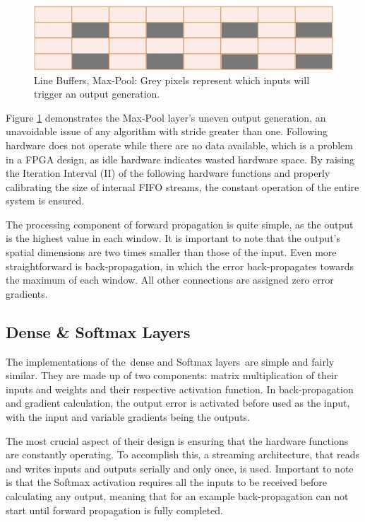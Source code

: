 \begin{figure}[H]
    \centering
        \includegraphics[width=1\textwidth]{Images/diagrams/line_buf_maxp.png}
        \decoRule
        \caption[Line Buffers, Max-Pool]{Line Buffers, Max-Pool: Grey pixels represent which inputs will trigger an output generation.}
        \label{fig: Line Buffers Max-Pool}
\end{figure}

Figure \ref{fig: Line Buffers Max-Pool} demonstrates the Max-Pool layer's uneven output generation, an unavoidable issue of any algorithm with stride greater than one. Following hardware does not operate while there are no data available, which is a problem in a FPGA design, as idle hardware indicates wasted hardware space. By raising the Iteration Interval (II) of the following hardware functions and properly calibrating the size of internal FIFO streams, the constant operation of the entire system is ensured.

The processing component of forward propagation is quite simple, as the output is the highest value in each window. It is important to note that the output's spatial dimensions are two times smaller than those of the input. Even more straightforward is back-propagation, in which the error back-propagates towards the maximum of each window. All other connections are assigned zero error gradients.

\subsection{Dense \& Softmax Layers}
The implementations of the dense and Softmax layers are simple and fairly similar. They are made up of two components: matrix multiplication of their inputs and weights and their respective activation function. In back-propagation and gradient calculation, the output error is activated before used as the input, with the input and variable gradients being the outputs.

The most crucial aspect of their design is ensuring that the hardware functions are constantly operating. To accomplish this, a streaming architecture, that reads and writes inputs and outputs serially and only once, is used. Important to note is that the Softmax activation requires all the inputs to be received before calculating any output, meaning that for an example back-propagation can not start until forward propagation is fully completed.

